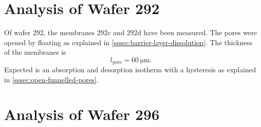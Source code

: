 \documentclass[thesis.tex]{subfiles}
\begin{document}
    \section{Analysis of Wafer 292}
    \label{sec:wafer292}

        Of wafer 292, the membranes 292c and 292d have been measured. The pores were opened by floating as explained in \cref{sssec:barrier-layer-dissolution}. The thickness of the membranes is
        \begin{equation}
            l_\mathrm{pore}=\SI{60}{\micro\meter}.
        \end{equation}
        Expected is an absorption and desorption isotherm with a hysteresis as explained in \cref{sssec:open-funnelled-pores}.


    \section{Analysis of Wafer 296}
    \label{sec:wafer296}
\end{document}
